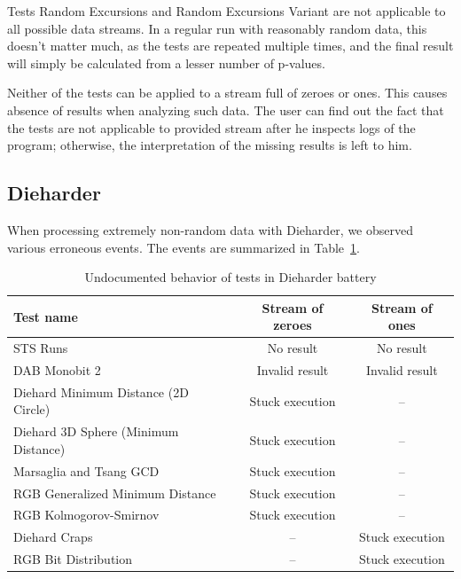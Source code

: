 \documentclass[
  digital,  	%
  color,		%
  oneside,   	%
  12pt,
  nocover,
  notable,
  nolof,
  nolot,
]{fithesis3}
\theoremstyle{definition}
\theoremstyle{remark}
\begin{document}
Tests Random Excursions and Random Excursions Variant are not applicable to all possible data streams. In a regular run with reasonably random data, this doesn't matter much, as the tests are repeated multiple times, and the final result will simply be calculated from a lesser number of p-values. 

Neither of the tests can be applied to a stream full of zeroes or ones. This causes absence of results when analyzing such data. The user can find out the fact that the tests are not applicable to provided stream after he inspects logs of the program; otherwise, the interpretation of the missing results is left to him.

\subsection*{Dieharder}
When processing extremely non-random data with Dieharder, we observed various erroneous events. The events are summarized in Table~\ref{tab:dieharder_errors}. 

\begin{table}[h!]
\begin{nomar}
\centering
\begin{tabular}{@{}lcc@{}} \toprule
\textbf{Test name}                   & \textbf{Stream of zeroes} & \textbf{Stream of ones} \\ \midrule
STS Runs                             & No result                & No result                \\
DAB Monobit 2 						 & Invalid result           & Invalid result           \\
Diehard Minimum Distance (2D Circle) & Stuck execution          & --                        \\
Diehard 3D Sphere (Minimum Distance) & Stuck execution          & --                        \\
Marsaglia and Tsang GCD              & Stuck execution          & --                        \\
RGB Generalized Minimum Distance     & Stuck execution          & --                        \\
RGB Kolmogorov-Smirnov               & Stuck execution          & --                        \\  
Diehard Craps                        & --                       & Stuck execution          \\
RGB Bit Distribution                 & --                       & Stuck execution          \\ \bottomrule
\end{tabular}
\end{nomar}
\caption{Undocumented behavior of tests in Dieharder battery}
\label{tab:dieharder_errors}
\end{table}
\end{document}
